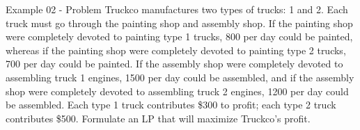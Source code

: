 \begin{frame}{Example 02 - Problem}
Truckco manufactures two types of trucks: 1 and 2. Each truck must go through 
the painting shop and assembly shop. If the painting shop were completely 
devoted to painting type 1 trucks, 800 per day could be painted, whereas if 
the painting shop were completely devoted to painting type 2 trucks, 700 per 
day could be painted. If the assembly shop were completely devoted to assembling 
truck 1 engines, 1500 per day could be assembled, and if the assembly shop were 
completely devoted to assembling truck 2 engines, 1200 per day could be 
assembled. Each type 1 truck contributes \$300 to profit; each type 2 truck 
contributes \$500. Formulate an LP that will maximize Truckco's profit.
\end{frame}
